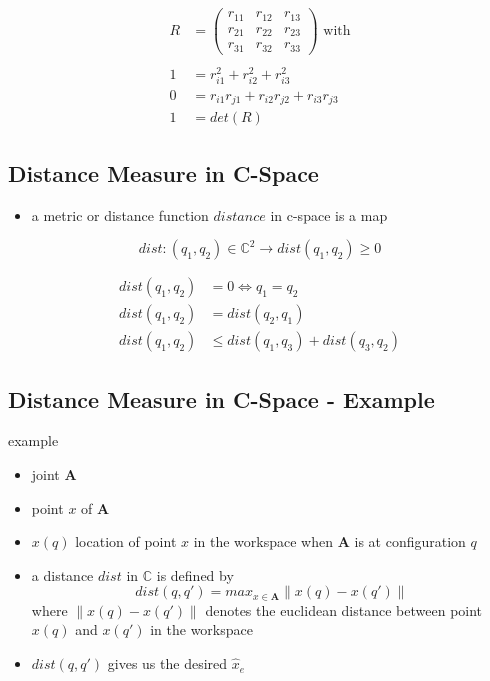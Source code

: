 \documentclass[%
  professionalfonts,%
  xcolor={%
    usenames,%
    dvipsnames,%
    svgnames,%
    table,%
    hyperref%
  }%
]{beamer}
\begin{document}
\begin{frame}
\begin{align*}
R & = \begin{pmatrix}
r_{11} & r_{12} & r_{13} \\
r_{21} & r_{22} & r_{23} \\
r_{31} & r_{32} & r_{33}
\end{pmatrix} \text{ with} \\ \\
1 & = r_{i1}^2+r_{i2}^2+r_{i3}^2 \\
0 & = r_{i1}r_{j1} + r_{i2}r_{j2} + r_{i3}r_{j3} \\
1 & = det(R)
\end{align*}
\end{frame}

\subsection{Distance Measure in C-Space}
\begin{frame}
	
\begin{itemize}
	\item a metric or distance function $distance$ in c-space is a map
\end{itemize}

\begin{equation*}
dist: (q_1,q_2) \in \mathbb{C}^2 \longrightarrow dist(q_1,q_2) \geq 0
\end{equation*}

\begin{align*}
dist(q_1,q_2) & = 0 \iff q_1 = q_2 \\
dist(q_1,q_2) & = dist(q_2,q_1) \\
dist(q_1,q_2) & \leq dist(q_1,q_3) + dist(q_3,q_2)
\end{align*}

\end{frame}

\subsection{Distance Measure in C-Space - Example}
\begin{frame}
example
\begin{itemize}
\item joint $\mathbf{A}$
\item point $x$ of $\mathbf{A}$
\item $x(q)$ location of point $x$ in the workspace when $\mathbf{A}$ is at configuration $q$
\item a distance $dist$ in $\mathbb{C}$ is defined by \begin{equation*}
dist(q,q') = max_{x \in \mathbf{A}} \lVert x(q) - x(q') \rVert
\end{equation*}
where $\lVert x(q) - x(q') \rVert$ denotes the euclidean distance between point $x(q)$ and $x(q')$ in the workspace
\item $dist(q,q')$ gives us the desired $\hat{x}_{e}$
\end{itemize}	
\end{frame}
\end{document}
